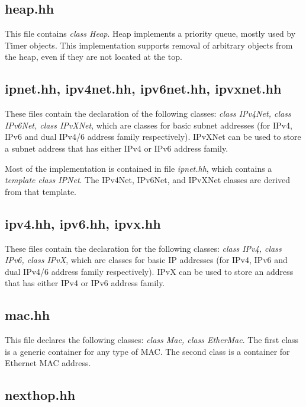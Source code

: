 \documentclass[11pt]{article}
\begin{document}
\subsection{heap.hh}

This file contains \emph{class Heap}.
Heap implements a priority queue, mostly used by Timer
objects. This implementation supports removal of arbitrary
objects from the heap, even if they are not located at the top.


\subsection{ipnet.hh, ipv4net.hh, ipv6net.hh, ipvxnet.hh}

These files contain the declaration of the following classes:
\emph{class IPv4Net, class IPv6Net, class IPvXNet}, which are
classes for basic subnet addresses (for IPv4, IPv6 and dual IPv4/6
address family respectively). IPvXNet can be used to store a subnet
address that has either IPv4 or IPv6 address family.

Most of the implementation is contained in file \emph{ipnet.hh}, which
contains a \emph{template class IPNet}. The IPv4Net, IPv6Net, and
IPvXNet classes are derived from that template.

\subsection{ipv4.hh, ipv6.hh, ipvx.hh}

These files contain the declaration for the following classes:
\emph{class IPv4, class IPv6, class IPvX}, which are
classes for basic IP addresses (for IPv4, IPv6 and dual IPv4/6
address family respectively). IPvX can be used to store an
address that has either IPv4 or IPv6 address family.

\subsection{mac.hh}

This file declares the following classes: \emph{class Mac, class
EtherMac}. The first class is a generic container for any type of MAC.
The second class is a container for Ethernet MAC address.

\subsection{nexthop.hh}
\end{document}
